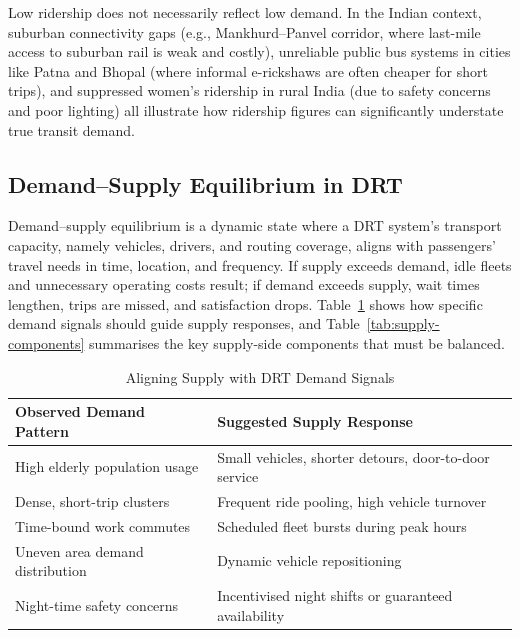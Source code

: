 \documentclass[12pt]{article}
\begin{document}
Low ridership does not necessarily reflect low demand. In the Indian context,
suburban connectivity gaps (e.g., Mankhurd--Panvel corridor, where last-mile access
to suburban rail is weak and costly), unreliable public bus systems in cities like
Patna and Bhopal (where informal e-rickshaws are often cheaper for short trips), and
suppressed women's ridership in rural India (due to safety concerns and poor
lighting) all illustrate how ridership figures can significantly understate true
transit demand.

\subsection{Demand--Supply Equilibrium in DRT}

Demand--supply equilibrium is a dynamic state where a DRT system's transport
capacity, namely vehicles, drivers, and routing coverage, aligns with passengers'
travel needs in time, location, and frequency. If supply exceeds demand, idle
fleets and unnecessary operating costs result; if demand exceeds supply, wait times
lengthen, trips are missed, and satisfaction drops. Table~\ref{tab:supply-align}
shows how specific demand signals should guide supply responses, and
Table~\ref{tab:supply-components} summarises the key supply-side components that
must be balanced.

\begin{table}[H]
\centering
\caption{Aligning Supply with DRT Demand Signals}
\label{tab:supply-align}
\small
\begin{tabular}{p{6cm}p{7.5cm}}
\toprule
\textbf{Observed Demand Pattern} & \textbf{Suggested Supply Response} \\
\midrule
High elderly population usage & Small vehicles, shorter detours, door-to-door service \\
Dense, short-trip clusters & Frequent ride pooling, high vehicle turnover \\
Time-bound work commutes & Scheduled fleet bursts during peak hours \\
Uneven area demand distribution & Dynamic vehicle repositioning \\
Night-time safety concerns & Incentivised night shifts or guaranteed availability \\
\bottomrule
\end{tabular}
\end{table}
\end{document}
